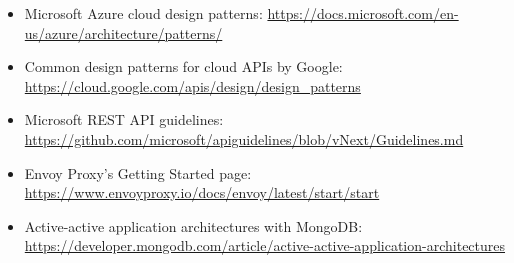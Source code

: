 \begin{itemize}
\item
Microsoft Azure cloud design patterns: \url{https://docs.microsoft.com/en-us/azure/architecture/patterns/}

\item
Common design patterns for cloud APIs by Google: \url{https://cloud.google.com/apis/design/design_patterns}

\item
Microsoft REST API guidelines: \url{https://github.com/microsoft/apiguidelines/blob/vNext/Guidelines.md}

\item
Envoy Proxy's Getting Started page: \url{https://www.envoyproxy.io/docs/envoy/latest/start/start}

\item
Active-active application architectures with MongoDB: \url{https://developer.mongodb.com/article/active-active-application-architectures}
\end{itemize}